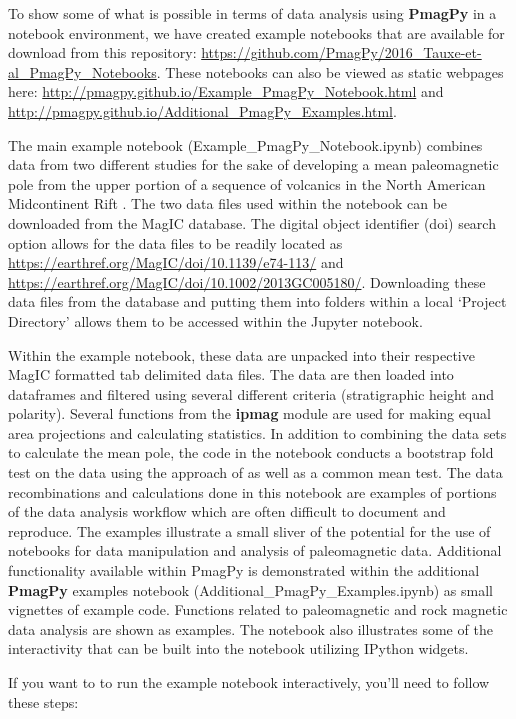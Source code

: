\documentclass[11pt]{book}
\begin{document}
{{To show some of what is possible in terms of data analysis using {\bf PmagPy} in a notebook environment, we have created example notebooks that are available for download from this repository: \url{https://github.com/PmagPy/2016_Tauxe-et-al_PmagPy_Notebooks}. These notebooks can also be viewed as static webpages here: \url{http://pmagpy.github.io/Example_PmagPy_Notebook.html} and \url{http://pmagpy.github.io/Additional_PmagPy_Examples.html}.

The main example notebook (Example\_PmagPy\_Notebook.ipynb) combines data from two different studies for the sake of developing a mean paleomagnetic pole from the upper portion of a sequence of volcanics in the North American Midcontinent Rift \citep{halls74, swansonhysell14}.  The two data files used within the notebook can be downloaded from the MagIC database. The digital object identifier (doi) search option allows for the data files to be readily located as  \url{https://earthref.org/MagIC/doi/10.1139/e74-113/} and \url{https://earthref.org/MagIC/doi/10.1002/2013GC005180/}. Downloading these data files from the database and putting them into folders within a local `Project Directory' allows them to be accessed within the Jupyter notebook.

Within the example notebook, these data are unpacked into their respective MagIC formatted tab delimited data files. The data are then loaded into dataframes and filtered using several different criteria (stratigraphic height and polarity).  Several functions from the {\bf ipmag} module are used for making equal area projections and calculating statistics. In addition to combining the data sets to calculate the mean pole, the code in the notebook conducts a bootstrap fold test on the data using the approach of \cite{tauxe94} as well as a common mean test. The data recombinations and calculations done in this notebook are examples of portions of the data analysis workflow which are often difficult to document and reproduce. The examples illustrate a small sliver of the potential for the use of notebooks for data manipulation and analysis of paleomagnetic data. Additional functionality available within PmagPy is demonstrated within the additional {\bf PmagPy} examples notebook (Additional\_PmagPy\_Examples.ipynb) as small vignettes of example code. Functions related to paleomagnetic and rock magnetic data analysis are shown as examples. The notebook also illustrates some of the interactivity that can be built into the notebook utilizing IPython widgets.

If you want to to run the example notebook interactively, you'll need to follow these steps:

}}
\end{document}
